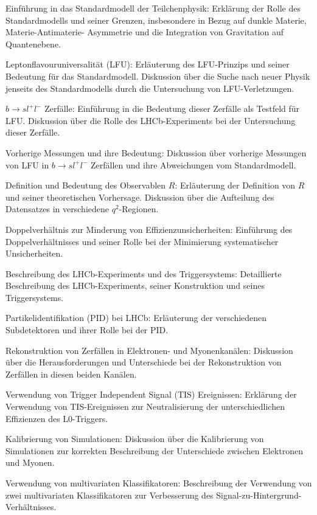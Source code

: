 Einführung in das Standardmodell der Teilchenphysik: 
Erklärung der Rolle des Standardmodells und seiner Grenzen, 
insbesondere in Bezug auf dunkle Materie, Materie-Antimaterie-
Asymmetrie und die Integration von Gravitation auf Quantenebene.

Leptonflavouruniversalität (LFU): 
Erläuterung des LFU-Prinzips und seiner Bedeutung für das 
Standardmodell. Diskussion über die Suche nach neuer Physik 
jenseits des Standardmodells durch die Untersuchung von 
LFU-Verletzungen.

$b\to sl^+l^-$ Zerfälle: 
Einführung in die Bedeutung dieser Zerfälle als Testfeld für LFU.
 Diskussion über die Rolle des LHCb-Experiments bei der Untersuchung dieser Zerfälle.

Vorherige Messungen und ihre Bedeutung: 
Diskussion über vorherige Messungen von LFU in $b\to sl^+l^-$ Zerfällen 
und ihre Abweichungen vom Standardmodell.

Definition und Bedeutung des Observablen $R$: 
Erläuterung der Definition von $R$ und seiner theoretischen Vorhersage. 
Diskussion über die Aufteilung des Datensatzes in verschiedene 
$q^2$-Regionen.

Doppelverhältnis zur Minderung von Effizienzunsicherheiten: 
Einführung des Doppelverhältnisses und seiner Rolle bei der 
Minimierung systematischer Unsicherheiten.

Beschreibung des LHCb-Experiments und des Triggersystems: 
Detaillierte Beschreibung des LHCb-Experiments, seiner Konstruktion 
und seines Triggersystems.

Partikelidentifikation (PID) bei LHCb: 
Erläuterung der verschiedenen Subdetektoren und ihrer Rolle bei 
der PID.

Rekonstruktion von Zerfällen in Elektronen- und Myonenkanälen: 
Diskussion über die Herausforderungen und Unterschiede bei der
Rekonstruktion von Zerfällen in diesen beiden Kanälen.

Verwendung von Trigger Independent Signal (TIS) Ereignissen: 
Erklärung der Verwendung von TIS-Ereignissen zur Neutralisierung der 
unterschiedlichen Effizienzen des L0-Triggers.

Kalibrierung von Simulationen: 
Diskussion über die Kalibrierung von Simulationen zur korrekten 
Beschreibung der Unterschiede zwischen Elektronen und Myonen.

Verwendung von multivariaten Klassifikatoren: 
Beschreibung der Verwendung von zwei multivariaten Klassifikatoren zur 
Verbesserung des Signal-zu-Hintergrund-Verhältnisses.

